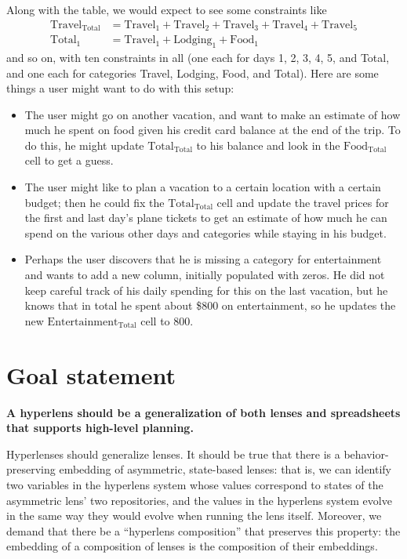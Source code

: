Along with the table, we would expect to see some constraints like
\begin{align*}
    \mathrm{Travel}_\mathrm{Total} &=
    \mathrm{Travel}_1+\mathrm{Travel}_2+\mathrm{Travel}_3+\mathrm{Travel}_4+\mathrm{Travel}_5
    \\
    \mathrm{Total}_1 &= \mathrm{Travel_1}+\mathrm{Lodging}_1+\mathrm{Food}_1
\end{align*}
and so on, with ten constraints in all (one each for days 1, 2, 3, 4, 5, and
Total, and one each for categories Travel, Lodging, Food, and Total). Here
are some things a user might want to do with this setup:
\begin{itemize}
    \item The user might go on another vacation, and want to make an
        estimate of how much he spent on food given his credit card balance
        at the end of the trip. To do this, he might update
        $\mathrm{Total}_\mathrm{Total}$ to his balance and look in the
        $\mathrm{Food}_\mathrm{Total}$ cell to get a guess.
    \item The user might like to plan a vacation to a certain
        location with a certain budget; then he could fix the
        $\mathrm{Total}_\mathrm{Total}$ cell and update the travel prices
        for the first and last day's plane tickets to get an estimate of how
        much he can spend on the various other days and categories while
        staying in his budget.
    \item Perhaps the user discovers that he is missing a category for
        entertainment and wants to add a new column, initially populated
        with zeros. He did not keep careful track of his daily spending for
        this on the last vacation, but he knows that in total he spent about
        \$800 on entertainment, so he updates the new
        $\mathrm{Entertainment}_\mathrm{Total}$ cell to 800.
\end{itemize}

\section{Goal statement}
\label{sec:goal_statement}
{\bf A hyperlens should be a generalization of both lenses and spreadsheets that
supports high-level planning.}

Hyperlenses should generalize lenses. It should be true that there is a
behavior-preserving embedding of asymmetric, state-based lenses: that is, we
can identify two variables in the hyperlens system whose values correspond
to states of the asymmetric lens' two repositories, and the values in the
hyperlens system evolve in the same way they would evolve when running the
lens itself. Moreover, we demand that there be a ``hyperlens composition''
that preserves this property: the embedding of a composition of lenses is
the composition of their embeddings.

